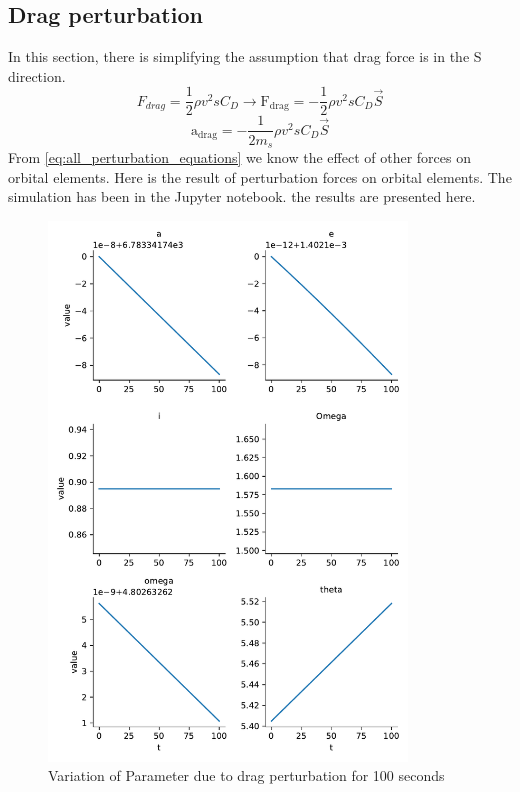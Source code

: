 \subsection{Drag perturbation}
In this section, there is simplifying the assumption that drag force is in the S direction.
$$
F_{drag} = \dfrac{1}{2}\rho v^2 s C_D \to \boldsymbol{\mathrm{F_{drag}}} = -\dfrac{1}{2}\rho v^2 s C_D \vec{S}
$$
$$
\boldsymbol{\mathrm{a_{drag}}} = -\dfrac{1}{2m_s}\rho v^2 s C_D \vec{S}
$$
From \eqref{eq:all_perturbation_equations} we know the effect of other forces on orbital elements. Here is the result of perturbation forces on orbital elements.
The simulation has been in the Jupyter notebook. the results are presented here.

\begin{figure}[H]
    \centering
    \includegraphics[width=0.85\textwidth]{../Figure/Q2/orbital_elements_drag_100.pdf}
    \caption{Variation of Parameter due to drag perturbation for 100 seconds}
\end{figure}

